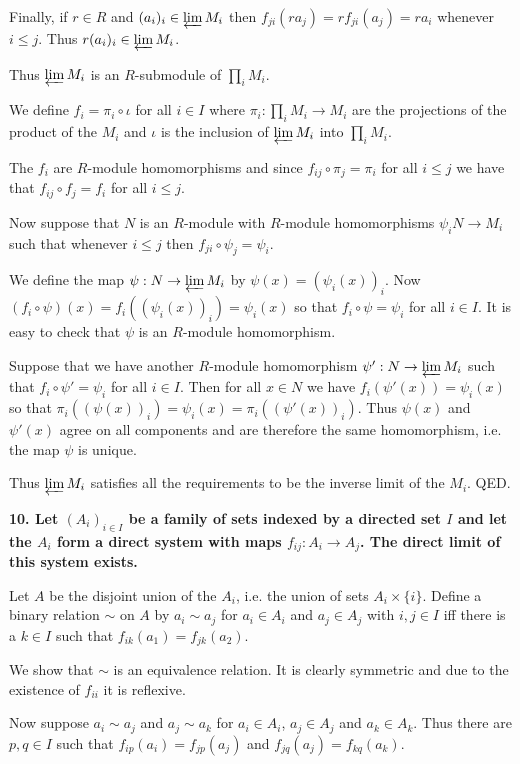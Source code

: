 \documentclass[12pt]{article}
\begin{document}
Finally, if $r \in R$ and $(a_i)_i \in \varprojlim M_i$ then $f_{ji}(ra_j) = rf_{ji}(a_j) = ra_i$ whenever $i \leq j$. Thus $r(a_i)_i \in \varprojlim M_i$.

Thus $\varprojlim M_i$ is an $R$-submodule of $\prod_i M_i$.

We define $f_i = \pi_i\circ \iota$ for all $i \in I$ where $\pi_i : \prod_i M_i \to M_i$ are the projections of the product of the $M_i$ and $\iota$ is the inclusion of $\varprojlim M_i$ into $\prod_i M_i$.

The $f_i$ are $R$-module homomorphisms and since $f_{ij}\circ \pi_j = \pi_i$ for all $i \leq j$ we have that $f_{ij}\circ f_j = f_i$ for all $i \leq j$.

Now suppose that $N$ is an $R$-module with $R$-module homomorphisms $\psi_i N \to M_i$ such that whenever $i \leq j$ then $f_{ji}\circ \psi_j = \psi_i$.

We define the map $\psi : N \to \varprojlim M_i$ by $\psi(x) = (\psi_i(x))_i$. Now $(f_i\circ \psi)(x) = f_i((\psi_i(x))_i) = \psi_i(x)$ so that $f_i\circ \psi = \psi_i$ for all $i \in I$. It is easy to check that $\psi$ is an $R$-module homomorphism.

Suppose that we have another $R$-module homomorphism $\psi' : N \to \varprojlim M_i$ such that $f_i\circ \psi' = \psi_i$ for all $i \in I$. Then for all $x \in N$ we have $f_i(\psi'(x)) = \psi_i(x)$ so that $\pi_i((\psi(x))_i) = \psi_i(x) = \pi_i((\psi'(x))_i)$. Thus $\psi(x)$ and $\psi'(x)$ agree on all components and are therefore the same homomorphism, i.e. the map $\psi$ is unique.

Thus $\varprojlim M_i$ satisfies all the requirements to be the inverse limit of the $M_i$. QED.

\textbf{10. Let $(A_i)_{i\in I}$ be a family of sets indexed by a directed set $I$ and let the $A_i$ form a direct system with maps $f_{ij} : A_i \to A_j$. The direct limit of this system exists.}

Let $A$ be the disjoint union of the $A_i$, i.e. the union of sets $A_i\times \{i\}$. Define a binary relation $\sim$ on $A$ by $a_i \sim a_j$ for $a_i \in A_i$ and $a_j \in A_j$ with $i, j \in I$ iff there is a $k \in I$ such that $f_{ik}(a_1) = f_{jk}(a_2)$.

We show that $\sim$ is an equivalence relation. It is clearly symmetric and due to the existence of $f_{ii}$ it is reflexive.

Now suppose $a_i \sim a_j$ and $a_j \sim a_k$ for $a_i \in A_i$, $a_j \in A_j$ and $a_k \in A_k$. Thus there are $p, q \in I$ such that $f_{ip}(a_i) = f_{jp}(a_j)$ and $f_{jq}(a_j) = f_{kq}(a_k)$.
\end{document}
